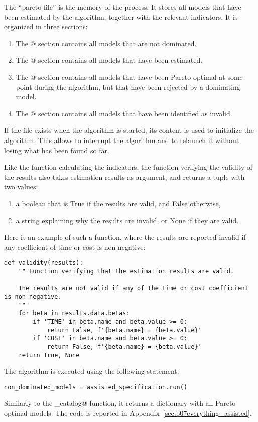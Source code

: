 \documentclass[12pt,a4paper]{article}
\begin{document}
The ``pareto file'' is the memory of the process. It stores all models that have been estimated by the algorithm, together with the relevant indicators. It is organized in three sections:
\begin{enumerate}
\item The \lstinline@[Pareto]@ section contains all models that are not dominated.
\item The \lstinline@[Considered]@ section contains all models that have been estimated.
\item The \lstinline@[Removed]@ section contains all models that have been Pareto optimal at some point during the algorithm, but that have been rejected by a dominating model.
\item The \lstinline@[Invalid]@ section contains all models that have been identified as invalid.
\end{enumerate}
If the file exists when the algorithm is started, its content is used to initialize the algorithm. This allows to interrupt the algorithm and to relaunch it without losing what has been found so far.

Like the function calculating the indicators, the function verifying the validity of the results also takes estimation results as argument, and returns a tuple with two values:
\begin{enumerate}
\item a boolean that is True if the results are valid, and False otherwise,
\item a string explaining why the results are invalid, or None if they are valid.
\end{enumerate}
Here is an example of such a function, where the results are reported invalid if any coefficient of time or cost is non negative:
\begin{lstlisting}
def validity(results):
    """Function verifying that the estimation results are valid.

    The results are not valid if any of the time or cost coefficient is non negative.
    """
    for beta in results.data.betas:
        if 'TIME' in beta.name and beta.value >= 0:
            return False, f'{beta.name} = {beta.value}'
        if 'COST' in beta.name and beta.value >= 0:
            return False, f'{beta.name} = {beta.value}'
    return True, None
\end{lstlisting}

The algorithm is executed using the following statement:
\begin{lstlisting}
non_dominated_models = assisted_specification.run()
\end{lstlisting}
Similarly to the \lstinline@estimate_catalog@ function, it returns a dictionary with all Pareto optimal models. The code is reported in Appendix~\ref{sec:b07everything_assisted}. 
\end{document}
